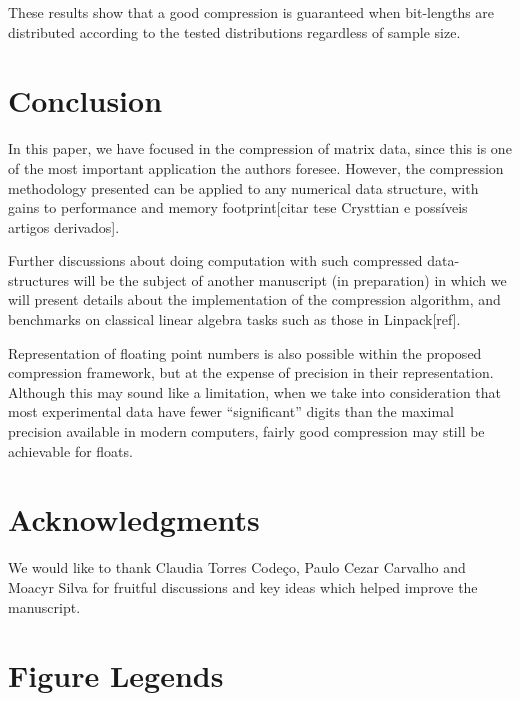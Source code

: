 \documentclass[10pt]{article}
\begin{document}
These results show that a good compression is guaranteed when bit-lengths are distributed according to the tested distributions regardless of sample size.

\section{Conclusion}
In this paper, we have focused in the compression of matrix data, since this is one of the most important application the authors foresee. However, the compression methodology presented can be applied to any numerical data structure, with gains to performance and memory footprint[citar tese Crysttian e possíveis artigos derivados]. 

Further discussions about doing computation with such compressed data-structures will be the subject of another manuscript (in preparation) in which we will present details about the implementation of the compression algorithm, and benchmarks on classical linear algebra tasks such as those in Linpack[ref].

Representation of floating point numbers is also possible within the proposed compression framework, but at the expense of precision in their representation. Although this may sound like a limitation, when we take into consideration that most experimental data have fewer ``significant'' digits than the maximal precision available in modern computers, fairly good compression may still be achievable for floats.



\section*{Acknowledgments}
We would like to thank Claudia Torres Code\c{c}o, Paulo Cezar Carvalho and Moacyr Silva for fruitful discussions and key ideas which helped improve the manuscript.



\section*{Figure Legends}
\end{document}
